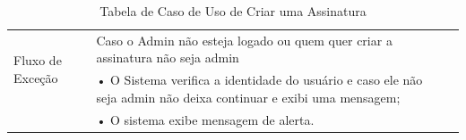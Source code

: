 \documentclass[a4paper,12pt]{article}
\begin{document}
\begin{table}[ht]
\begin{tabular}{|p{3.5cm}|p{10cm}|p{7cm}|}
        \multirow{2}{*}{Fluxo de Exceção}
                                           & Caso o Admin não esteja logado ou quem quer criar a assinatura não seja admin                                    \\
                                           & • O Sistema verifica a identidade do usuário e caso ele não seja admin não deixa continuar e exibi uma mensagem; \\
                                           & • O sistema exibe mensagem de alerta.                                                                            \\
        \hline
    \end{tabular}
    \caption{Tabela de Caso de Uso de Criar uma Assinatura}
\end{table}
\end{document}
